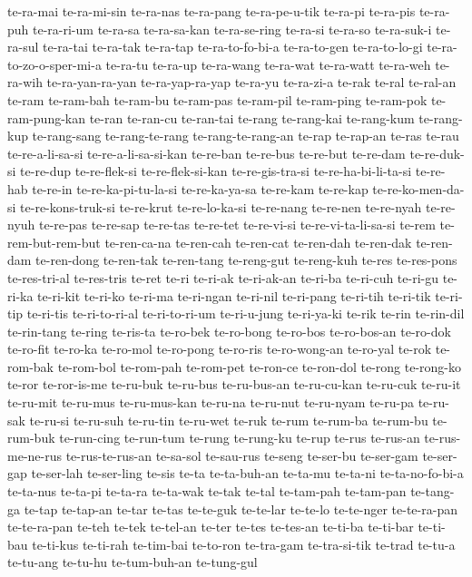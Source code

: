 {te-ra-mai te-ra-mi-sin te-ra-nas te-ra-pang te-ra-pe-u-tik te-ra-pi
te-ra-pis te-ra-puh te-ra-ri-um te-ra-sa te-ra-sa-kan te-ra-se-ring
te-ra-si te-ra-so te-ra-suk-i te-ra-sul te-ra-tai te-ra-tak te-ra-tap
te-ra-to-fo-bi-a te-ra-to-gen te-ra-to-lo-gi te-ra-to-zo-o-sper-mi-a
te-ra-tu te-ra-up te-ra-wang te-ra-wat te-ra-watt te-ra-weh te-ra-wih
te-ra-yan-ra-yan te-ra-yap-ra-yap te-ra-yu te-ra-zi-a te-rak te-ral
te-ral-an te-ram te-ram-bah te-ram-bu te-ram-pas te-ram-pil te-ram-ping
te-ram-pok te-ram-pung-kan te-ran te-ran-cu te-ran-tai te-rang te-rang-kai
te-rang-kum te-rang-kup te-rang-sang te-rang-te-rang te-rang-te-rang-an
te-rap te-rap-an te-ras te-rau te-re-a-li-sa-si te-re-a-li-sa-si-kan
te-re-ban te-re-bus te-re-but te-re-dam te-re-duk-si te-re-dup
te-re-flek-si te-re-flek-si-kan te-re-gis-tra-si te-re-ha-bi-li-ta-si
te-re-hab te-re-in te-re-ka-pi-tu-la-si te-re-ka-ya-sa te-re-kam te-re-kap
te-re-ko-men-da-si te-re-kons-truk-si te-re-krut te-re-lo-ka-si te-re-nang
te-re-nen te-re-nyah te-re-nyuh te-re-pas te-re-sap te-re-tas te-re-tet
te-re-vi-si te-re-vi-ta-li-sa-si te-rem te-rem-but-rem-but te-ren-ca-na
te-ren-cah te-ren-cat te-ren-dah te-ren-dak te-ren-dam te-ren-dong
te-ren-tak te-ren-tang te-reng-gut te-reng-kuh te-res te-res-pons
te-res-tri-al te-res-tris te-ret te-ri te-ri-ak te-ri-ak-an te-ri-ba
te-ri-cuh te-ri-gu te-ri-ka te-ri-kit te-ri-ko te-ri-ma te-ri-ngan
te-ri-nil te-ri-pang te-ri-tih te-ri-tik te-ri-tip te-ri-tis
te-ri-to-ri-al te-ri-to-ri-um te-ri-u-jung te-ri-ya-ki te-rik te-rin
te-rin-dil te-rin-tang te-ring te-ris-ta te-ro-bek te-ro-bong te-ro-bos
te-ro-bos-an te-ro-dok te-ro-fit te-ro-ka te-ro-mol te-ro-pong te-ro-ris
te-ro-wong-an te-ro-yal te-rok te-rom-bak te-rom-bol te-rom-pah te-rom-pet
te-ron-ce te-ron-dol te-rong te-rong-ko te-ror te-ror-is-me te-ru-buk
te-ru-bus te-ru-bus-an te-ru-cu-kan te-ru-cuk te-ru-it te-ru-mit te-ru-mus
te-ru-mus-kan te-ru-na te-ru-nut te-ru-nyam te-ru-pa te-ru-sak te-ru-si
te-ru-suh te-ru-tin te-ru-wet te-ruk te-rum te-rum-ba te-rum-bu te-rum-buk
te-run-cing te-run-tum te-rung te-rung-ku te-rup te-rus te-rus-an
te-rus-me-ne-rus te-rus-te-rus-an te-sa-sol te-sau-rus te-seng te-ser-bu
te-ser-gam te-ser-gap te-ser-lah te-ser-ling te-sis te-ta te-ta-buh-an
te-ta-mu te-ta-ni te-ta-no-fo-bi-a te-ta-nus te-ta-pi te-ta-ra te-ta-wak
te-tak te-tal te-tam-pah te-tam-pan te-tang-ga te-tap te-tap-an te-tar
te-tas te-te-guk te-te-lar te-te-lo te-te-nger te-te-ra-pan te-te-ra-pan
te-teh te-tek te-tel-an te-ter te-tes te-tes-an te-ti-ba te-ti-bar
te-ti-bau te-ti-kus te-ti-rah te-tim-bai te-to-ron te-tra-gam
te-tra-si-tik te-trad te-tu-a te-tu-ang te-tu-hu te-tum-buh-an te-tung-gul
}
